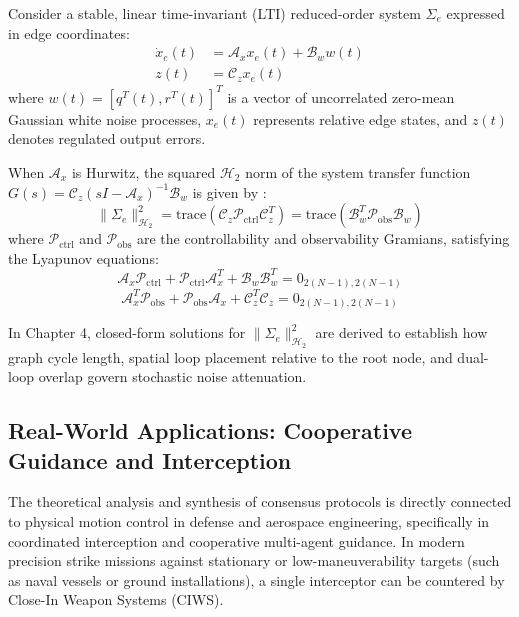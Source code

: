 Consider a stable, linear time-invariant (LTI) reduced-order system $\Sigma_e$ expressed in edge coordinates:
\begin{equation}\label{eq:h2_system_def}
    \begin{aligned}
        \dot{x}_e(t) &= \mathcal{A}_x x_e(t) + \mathcal{B}_w w(t) \\
        z(t) &= \mathcal{C}_z x_e(t)
    \end{aligned}
\end{equation}
where $w(t) = [q^T(t), r^T(t)]^T$ is a vector of uncorrelated zero-mean Gaussian white noise processes, $x_e(t)$ represents relative edge states, and $z(t)$ denotes regulated output errors.

When $\mathcal{A}_x$ is Hurwitz, the squared $\mathcal{H}_2$ norm of the system transfer function $G(s) = \mathcal{C}_z (s I - \mathcal{A}_x)^{-1} \mathcal{B}_w$ is given by \cite{dullerud2013course}:
\begin{equation}\label{eq:h2_norm_trace}
    \|\Sigma_e\|_{\mathcal{H}_2}^2 = \text{trace}(\mathcal{C}_z \mathcal{P}_{\text{ctrl}} \mathcal{C}_z^T) = \text{trace}(\mathcal{B}_w^T \mathcal{P}_{\text{obs}} \mathcal{B}_w)
\end{equation}
where $\mathcal{P}_{\text{ctrl}}$ and $\mathcal{P}_{\text{obs}}$ are the controllability and observability Gramians, satisfying the Lyapunov equations:
\begin{equation}\label{eq:lyapunov_equations}
    \mathcal{A}_x \mathcal{P}_{\text{ctrl}} + \mathcal{P}_{\text{ctrl}} \mathcal{A}_x^T + \mathcal{B}_w \mathcal{B}_w^T = 0_{2(N-1), 2(N-1)}
\end{equation}
\begin{equation}
    \mathcal{A}_x^T \mathcal{P}_{\text{obs}} + \mathcal{P}_{\text{obs}} \mathcal{A}_x + \mathcal{C}_z^T \mathcal{C}_z = 0_{2(N-1), 2(N-1)}
\end{equation}

In Chapter 4, closed-form solutions for $\|\Sigma_e\|_{\mathcal{H}_2}^2$ are derived to establish how graph cycle length, spatial loop placement relative to the root node, and dual-loop overlap govern stochastic noise attenuation.


\subsection{Real-World Applications: Cooperative Guidance and Interception}
The theoretical analysis and synthesis of consensus protocols is directly connected to physical motion control in defense and aerospace engineering, specifically in coordinated interception and cooperative multi-agent guidance. In modern precision strike missions against stationary or low-maneuverability targets (such as naval vessels or ground installations), a single interceptor can be countered by Close-In Weapon Systems (CIWS).

